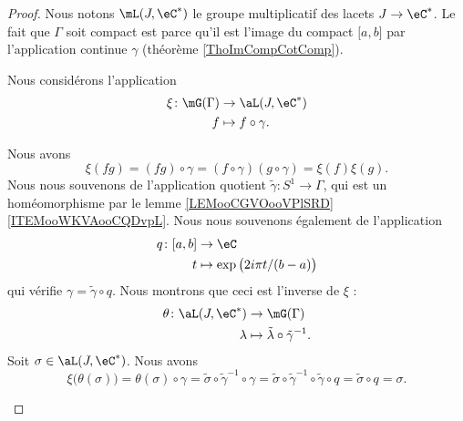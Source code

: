 \begin{proof}
	Nous notons \( \mL(J,\eC^*)\) le groupe multiplicatif des lacets \( J\to \eC^*\). Le fait que \( \Gamma\) soit compact est parce qu'il est l'image du compact \( \mathopen[ a , b \mathclose]\) par l'application continue \( \gamma\) (théorème \ref{ThoImCompCotComp}).

	Nous considérons l'application
	\begin{equation}
		\begin{aligned}
			\xi\colon \mG(\Gamma) & \to \aL(J,\eC^*)       \\
			f                     & \mapsto f\circ \gamma.
		\end{aligned}
	\end{equation}
	\begin{subproof}
		Nous avons
		\begin{equation}
			\xi(fg)=(fg)\circ \gamma=(f\circ \gamma)(g\circ \gamma)=\xi(f)\xi(g).
		\end{equation}
		Nous nous souvenons de l'application quotient \( \tilde \gamma\colon S^1\to \Gamma\), qui est un homéomorphisme par le lemme \ref{LEMooCGVOooVPlSRD}\ref{ITEMooWKVAooCQDvpL}. Nous nous souvenons également de l'application
		\begin{equation}
			\begin{aligned}
				q\colon \mathopen[ a , b \mathclose] & \to \eC                               \\
				t                                    & \mapsto \exp\big( 2i\pi t/(b-a) \big)
			\end{aligned}
		\end{equation}
		qui vérifie \( \gamma=\tilde \gamma\circ q\). Nous montrons que ceci est l'inverse de \( \xi\) :
		\begin{equation}
			\begin{aligned}
				\theta\colon \aL(J,\eC^*) & \to \mG(\Gamma)                                \\
				\lambda                   & \mapsto \tilde \lambda\circ\tilde \gamma^{-1}.
			\end{aligned}
		\end{equation}
		Soit \( \sigma\in\aL(J,\eC^*)\). Nous avons
		\begin{equation}
			\xi\big( \theta(\sigma) \big)=\theta(\sigma)\circ\gamma=\tilde \sigma\circ\tilde \gamma^{-1}\circ\gamma=\tilde \sigma\circ\tilde \gamma^{-1}\circ\tilde \gamma\circ q=\tilde \sigma\circ q=\sigma.

\end{equation}
\end{subproof}
\end{proof}
